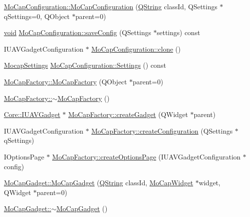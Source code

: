 \begin{DoxyCompactItemize}
\item 
\hyperlink{group___mo_cap_plugin_ga98e918c3063a6ec66da51a9532174cc8}{\-Mo\-Cap\-Configuration\-::\-Mo\-Cap\-Configuration} (\hyperlink{group___u_a_v_objects_plugin_gab9d252f49c333c94a72f97ce3105a32d}{\-Q\-String} class\-Id, \-Q\-Settings $\ast$q\-Settings=0, \-Q\-Object $\ast$parent=0)
\item 
\hyperlink{group___u_a_v_objects_plugin_ga444cf2ff3f0ecbe028adce838d373f5c}{void} \hyperlink{group___mo_cap_plugin_ga4890815d185a0393db178dd686be0bdb}{\-Mo\-Cap\-Configuration\-::save\-Config} (\-Q\-Settings $\ast$settings) const 
\item 
\-I\-U\-A\-V\-Gadget\-Configuration $\ast$ \hyperlink{group___mo_cap_plugin_gadc51635684ea1cfd6355b0ad8e0b40a6}{\-Mo\-Cap\-Configuration\-::clone} ()
\item 
\hyperlink{group___mo_cap_plugin_ga6083347a5b3eb70e360f599354dc0f0b}{\-Mocap\-Settings} \hyperlink{group___mo_cap_plugin_ga27cf83efd45539e4f87288010c5f285a}{\-Mo\-Cap\-Configuration\-::\-Settings} () const 
\item 
\hyperlink{group___mo_cap_plugin_ga4c5fc1e339794bad8a5ad59687380db0}{\-Mo\-Cap\-Factory\-::\-Mo\-Cap\-Factory} (\-Q\-Object $\ast$parent=0)
\item 
\hyperlink{group___mo_cap_plugin_gae7570bd6937d0e589152551bd0ff5cf1}{\-Mo\-Cap\-Factory\-::$\sim$\-Mo\-Cap\-Factory} ()
\item 
\hyperlink{class_core_1_1_i_u_a_v_gadget}{\-Core\-::\-I\-U\-A\-V\-Gadget} $\ast$ \hyperlink{group___mo_cap_plugin_ga4a3cc25be4de282c2017c0e9db77e31d}{\-Mo\-Cap\-Factory\-::create\-Gadget} (\-Q\-Widget $\ast$parent)
\item 
\-I\-U\-A\-V\-Gadget\-Configuration $\ast$ \hyperlink{group___mo_cap_plugin_gacb27abd92b935f31e14c22c97795e4e6}{\-Mo\-Cap\-Factory\-::create\-Configuration} (\-Q\-Settings $\ast$q\-Settings)
\item 
\-I\-Options\-Page $\ast$ \hyperlink{group___mo_cap_plugin_gaea471065fa9f7d73e26e9b744f2bb117}{\-Mo\-Cap\-Factory\-::create\-Options\-Page} (\-I\-U\-A\-V\-Gadget\-Configuration $\ast$config)
\item 
\hyperlink{group___mo_cap_plugin_ga539f5d9892beeecc36e51d97dacd3263}{\-Mo\-Cap\-Gadget\-::\-Mo\-Cap\-Gadget} (\hyperlink{group___u_a_v_objects_plugin_gab9d252f49c333c94a72f97ce3105a32d}{\-Q\-String} class\-Id, \hyperlink{class_mo_cap_widget}{\-Mo\-Cap\-Widget} $\ast$widget, \-Q\-Widget $\ast$parent=0)
\item 
\hyperlink{group___mo_cap_plugin_gabcb6599fae9fd93655a6f2c9d72f13e0}{\-Mo\-Cap\-Gadget\-::$\sim$\-Mo\-Cap\-Gadget} ()

\end{DoxyCompactItemize}
